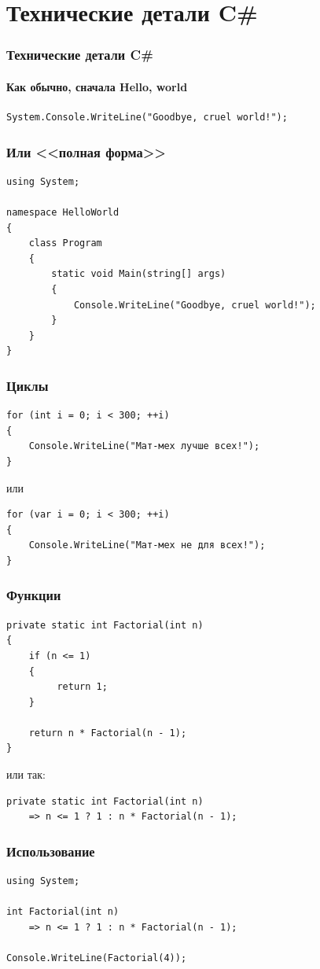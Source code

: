 \documentclass[xetex,mathserif,serif]{beamer}
\begin{document}
    \section{Технические детали C\#}

    \begin{frame}[fragile]
        \frametitle{Технические детали C\#}
        \framesubtitle{Как обычно, сначала Hello, world}
        \begin{verbatim}
System.Console.WriteLine("Goodbye, cruel world!");
        \end{verbatim}
    \end{frame}

    \begin{frame}[fragile]
        \frametitle{Или <<полная форма>>}
        \begin{verbatim}
using System;

namespace HelloWorld
{
    class Program
    {
        static void Main(string[] args)
        {
            Console.WriteLine("Goodbye, cruel world!");
        }
    }
}
        \end{verbatim}
    \end{frame}

    \begin{frame}[fragile]
        \frametitle{Циклы}
        \begin{verbatim}
for (int i = 0; i < 300; ++i)
{
    Console.WriteLine("Мат-мех лучше всех!");
}
        \end{verbatim}
        или
        \begin{verbatim}
for (var i = 0; i < 300; ++i)
{
    Console.WriteLine("Мат-мех не для всех!");
}
        \end{verbatim}
    \end{frame}

    \begin{frame}[fragile]
        \frametitle{Функции}
        \begin{verbatim}
private static int Factorial(int n)
{
    if (n <= 1)
    {
         return 1;
    }

    return n * Factorial(n - 1);
}
        \end{verbatim}
        или так:
        \begin{verbatim}
private static int Factorial(int n) 
    => n <= 1 ? 1 : n * Factorial(n - 1);
        \end{verbatim}
    \end{frame}

    \begin{frame}[fragile]
        \frametitle{Использование}
        \begin{verbatim}
using System;

int Factorial(int n) 
    => n <= 1 ? 1 : n * Factorial(n - 1);

Console.WriteLine(Factorial(4));

        \end{verbatim}
    \end{frame}
\end{document}
